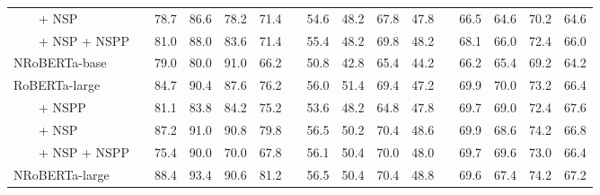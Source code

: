 \begin{tabular}{l r@{\hspace{0.10in}} rrrr r@{\hspace{0.10in}} rrrr r@{\hspace{0.10in}} rrrr}
~~~~+ NSP && 78.7 & 86.6 & 78.2 & 71.4  &&  54.6  &  48.2  &  67.8  &  47.8  &&  66.5  &  64.6  &  70.2  &  64.6  \\ 
~~~~+ NSP + NSPP &&  81.0 & 88.0 & 83.6 & 71.4  &&  55.4  &  48.2  &  69.8  &  48.2  &&  68.1  &  66.0  &  72.4  &  66.0  \\
{NRoBERTa-base} && 79.0 & 80.0 & 91.0 & 66.2 && 50.8 & 42.8 & 65.4 & 44.2 && 66.2 & 65.4 & 69.2 & 64.2\\
\midrule
{RoBERTa-large}  &&  84.7  &  90.4  &  87.6  &  76.2  &&  56.0  &  51.4  &  69.4  &  47.2  &&  69.9  &  70.0  &  73.2  &  66.4  \\ 
~~~~+ NSPP &&  81.1  &  83.8  &  84.2  &  75.2  &&  53.6  &  48.2  &  64.8  &  47.8  &&  69.7  &  69.0  &  72.4  &  67.6  \\ 
~~~~+ NSP &&  87.2  &  91.0  &  90.8  &  79.8  &&  56.5  &  50.2  &  70.4  &  48.6  &&  69.9  &  68.6  &  74.2  &  66.8  \\ 
~~~~+ NSP + NSPP &&  75.4  &  90.0  &  70.0  &  67.8  &&  56.1  &  50.4  &  70.0  &  48.0  &&  69.7  &  69.6  &  73.0  &  66.4  \\
{NRoBERTa-large} && 88.4 & 93.4 & 90.6 & 81.2 && 56.5 & 50.4 & 70.4 & 48.8 && 69.6 & 67.4 & 74.2 & 67.2 \\

\bottomrule
\end{tabular}
